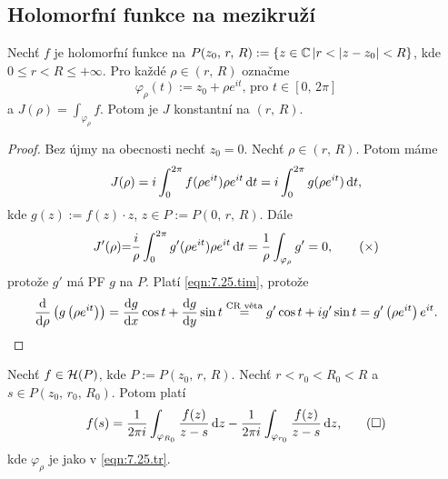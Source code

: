 
\subsection{Holomorfní funkce na mezikruží}
\begin{lemma}
Nechť $f$ je holomorfní funkce na $P(z_0,\,r,\,R):=\{z \in \Comp | r<|z-z_0|<R \}$, kde $0\leq r < R \leq + \infty$. Pro každé $\rho \in (r,\,R)$ označme
\begin{equation}
     \varphi_\rho(t):=z_0+\rho e^{it} \text{, pro } t\in [0,\,2 \pi]
     \tag{$\triangle$}
     \label{eqn:7.25.tr}
\end{equation} 
a $J(\rho)=\int_{\varphi_\rho}f$. Potom je $J$ konstantní na $(r,\,R)$.
\end{lemma}

\begin{proof}
Bez újmy na obecnosti nechť $z_0=0$. Nechť $\rho \in (r,\,R)$. Potom máme 
$$J(\rho)=i\int_0^{2\pi}f(\rho e^{it})\rho e^{it} \mathop{}\!\mathrm{d} t= \\ i\int_0^{2\pi}g(\rho e^{it})\mathop{}\!\mathrm{d} t,$$ 
kde $g(z):=f(z)\cdot z$, $z \in P:=P(0,\,r,\,R)$. Dále 
\begin{equation}
    J'(\rho){=} \frac{i}{\rho}\int_0^{2\pi}g'(\rho e^{it})\rho e^{it} \mathop{}\!\mathrm{d} t=\frac{1}{\rho}\int_{\varphi_\rho}g'=0, 
    \tag{$\times$}
    \label{eqn:7.25.tim}
\end{equation}
protože $g'$ má PF $g$ na $P$. Platí \cref{eqn:7.25.tim}, protože 
$$\frac{\mathop{}\!\mathrm{d}}{\mathop{}\!\mathrm{d} \rho}\left(g\left(\rho e^{it}\right)\right)=\frac{\mathop{}\!\mathrm{d} g}{\mathop{}\!\mathrm{d} x} \cos t+ \frac{\mathop{}\!\mathrm{d} g}{\mathop{}\!\mathrm{d} y} \sin t\stackrel{\text{CR věta}}{=}g' \cos t+ i g' \sin t=g'\left(\rho e^{it}\right)e^{it}.$$
\end{proof}

\begin{theorem}
Nechť $f \in \operatorname{\mathcal{H}} (P)$, kde $P:=P(z_0,\,r,\,R)$. Nechť $r<r_0<R_0<R$ a $s \in P(z_0,\,r_0,\,R_0)$. Potom platí
\begin{equation}
    f(s)=\frac{1}{2 \pi i}\int_{\varphi_{R_0}}\frac{f(z)}{z-s} \mathop{}\!\mathrm{d} z - \frac{1}{2 \pi i}\int_{\varphi_{r_0}}\frac{f(z)}{z-s} \mathop{}\!\mathrm{d} z\text{,}
    \tag{$\square$}
    \label{eqn:7.26.sq}
\end{equation}
kde $\varphi_\rho$ je jako v \cref{eqn:7.25.tr}.
\end{theorem}


